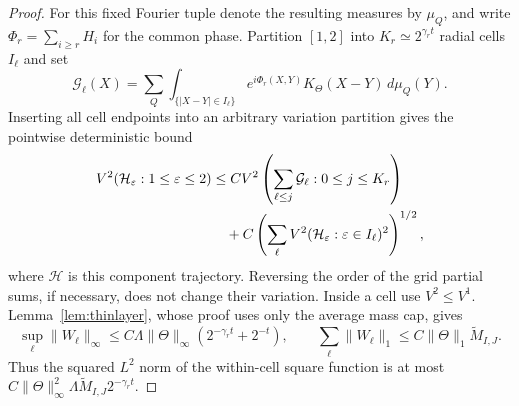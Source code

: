 \documentclass[11pt]{article}
\numberwithin{equation}{section}
\theoremstyle{remark}
\theoremstyle{definition}
\newcommand{\norm}[1]{\lVert #1\rVert}
\begin{document}
\begin{proof}
For this fixed Fourier tuple denote the resulting measures by $\mu_Q$,
and write $\Phi_r=\sum_{i\ge r}H_i$ for the common phase.  Partition
$[1,2]$ into $K_r\simeq2^{\gamma_rt}$ radial cells $I_\ell$ and set
\[
 \mathcal G_\ell(X)=
 \sum_Q\int_{\{|X-Y|\in I_\ell\}}
 e^{i\Phi_r(X,Y)}K_\Theta(X-Y)\,d\mu_Q(Y).
\]
Inserting all cell endpoints into an arbitrary variation partition gives
the pointwise deterministic bound
\begin{align}\label{eq:direct-high-grid-decomposition}
 V^2(\mathcal H_\varepsilon:1\le\varepsilon\le2)
 &\le C V^2\left(\sum_{\ell\le j}\mathcal G_\ell:
                  0\le j\le K_r\right)\notag\\
 &\quad+C\left(\sum_\ell
 V^2(\mathcal H_\varepsilon:\varepsilon\in I_\ell)^2\right)^{1/2},
\end{align}
where $\mathcal H$ is this component trajectory.  Reversing the order of
the grid partial sums, if necessary, does not change their variation.
Inside a cell use $V^2\le V^1$.
Lemma~\ref{lem:thinlayer}, whose proof uses only the average mass cap,
gives
\[
 \sup_\ell\norm{W_\ell}_\infty
 \le C\Lambda\norm\Theta_\infty(2^{-\gamma_rt}+2^{-t}),
 \qquad
 \sum_\ell\norm{W_\ell}_1\le C\norm\Theta_1\widetilde M_{I,J}.
\]
Thus the squared $L^2$ norm of the within-cell square function is at most
$C\norm\Theta_\infty^2\Lambda\widetilde M_{I,J}2^{-\gamma_rt}$.


\end{proof}
\end{document}
